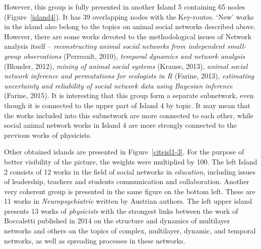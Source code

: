 \documentclass[11pt]{article} %
\begin{document}
However, this group is fully presented in another Island 5 containing 65 nodes (Figure~\ref{island4}). It has 39 overlapping nodes with the Key-routes. `New' works in the island also belong to the topics on animal social networks described above. However, there are some works devoted to the methodological issues of Network analysis itself --  \textit{reconstructing animal social networks from independent small-group observations} (Perreault, 2010), \textit{temporal dynamics and network analysis} (Blonder, 2012), \textit{mining of animal social systems} (Krause, 2013), \textit{animal social network inference and permutations for ecologists in R} (Farine, 2013), \textit{estimating uncertainty and reliability of social network data using Bayesian inference} (Farine, 2015). It is interesting that this group form a separate subnetwork, even though it is connected to the upper part of Island 4 by topic. It may mean that the works included into this subnetwork are more connected to each other, while social animal network works in Island 4 are more strongly connected to the previous works of physicists.  \medskip

Other obtained islands are presented in Figure~\ref{citeisl1-3}. For the purpose of better visibility of the picture, the weights were multiplied by 100. The left Island 2 consists of 12 works in the field of social networks in \textit{education}, including issues of leadership, teachers and students communication and collaboration. Another very coherent group is presented in the same figure on the bottom left. These are 11 works in \textit{Neuropsychiatrie} written by Austrian authors. The left upper island presents 13 works of \textit{physicists} with the strongest links between the work of Boccaletti published in 2014 on the structure and dynamics of multilayer networks and others on the topics of complex, multilayer, dynamic, and temporal networks, as well as spreading processes in these networks.  \medskip    
\end{document}
